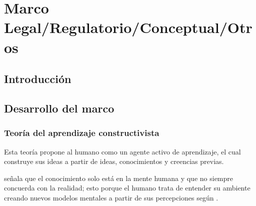 \renewcommand{\baselinestretch}{1.5}
\onehalfspacing
{}

\chapter{Marco Legal/Regulatorio/Conceptual/Otros}

\section{Introducción}


\section{Desarrollo del marco}





\subsection{Teoría del aprendizaje constructivista}

Esta teoría propone al humano como un agente activo de aprendizaje, el cual construye sus ideas a partir de ideas, conocimientos y creencias previas.

\cite{} señala que el conocimiento solo está en la mente humana y que no siempre concuerda con la realidad; esto porque el humano trata de entender su ambiente creando nuevos modelos mentales a partir de sus percepciones según \cite{}.

